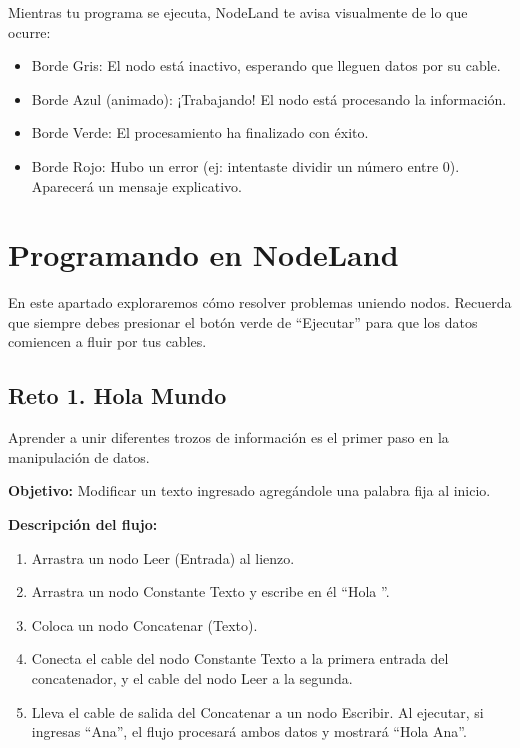 Mientras tu programa se ejecuta, NodeLand te avisa visualmente de lo que ocurre:

\begin{itemize}
    \item Borde Gris: El nodo está inactivo, esperando que lleguen datos por su cable.
    \item Borde Azul (animado): ¡Trabajando! El nodo está procesando la información.
    \item Borde Verde: El procesamiento ha finalizado con éxito.
    \item Borde Rojo: Hubo un error (ej: intentaste dividir un número entre 0). Aparecerá un mensaje explicativo.
\end{itemize}

\section*{Programando en NodeLand}

En este apartado exploraremos cómo resolver problemas uniendo nodos. Recuerda que siempre debes presionar el botón verde de “Ejecutar” para que los datos comiencen a fluir por tus cables.

\subsection*{Reto 1. Hola Mundo}

Aprender a unir diferentes trozos de información es el primer paso en la manipulación de datos.

\textbf{Objetivo:} Modificar un texto ingresado agregándole una palabra fija al inicio.

\textbf{Descripción del flujo:}

\begin{enumerate}
    \item Arrastra un nodo Leer (Entrada) al lienzo.
    \item Arrastra un nodo Constante Texto y escribe en él “Hola ”.
    \item Coloca un nodo Concatenar (Texto).
    \item Conecta el cable del nodo Constante Texto a la primera entrada del concatenador, y el cable del nodo Leer a la segunda.
    \item Lleva el cable de salida del Concatenar a un nodo Escribir. Al ejecutar, si ingresas “Ana”, el flujo procesará ambos datos y mostrará “Hola Ana”.
\end{enumerate}

